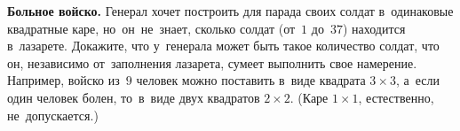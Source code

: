 \begin{problems}
\item\textbf{Больное войско.}
Генерал хочет построить для парада своих солдат в~одинаковые квадратные каре,
но~он~не~знает, сколько солдат (от~$1$ до~$37$) находится в~лазарете.
Докажите, что у~генерала может быть такое количество солдат, что он, независимо
от~заполнения лазарета, сумеет выполнить свое намерение.
Например, войско из~$9$ человек можно поставить в~виде квадрата $3 \times 3$,
а~если один человек болен, то~в~виде двух квадратов $2 \times 2$.
(Каре $1 \times 1$, естественно, не~допускается.)

\end{problems}

